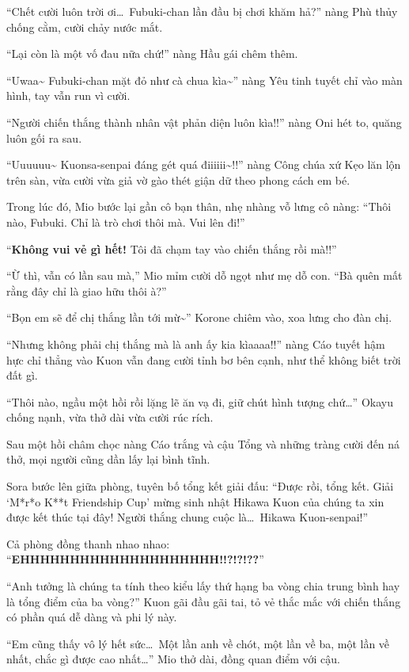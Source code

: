\documentclass[../main.tex]{subfiles}
\begin{document}
``Chết cười luôn trời ơi\dots\ Fubuki-chan lần đầu bị chơi khăm hả?'' nàng Phù thủy chống cằm, cười chảy nước mắt.

``Lại còn là một vố đau nữa chứ!'' nàng Hầu gái chêm thêm.

``Uwaa\~{} Fubuki-chan mặt đỏ như cà chua kìa\~{}'' nàng Yêu tinh tuyết chỉ vào màn hình, tay vẫn run vì cười.

``Người chiến thắng thành nhân vật phản diện luôn kìa!!'' nàng Oni hét to, quăng luôn gối ra sau.

``Uuuuuu\~{} Kuonsa-senpai đáng gét quá điiiiii\~{}!!'' nàng Công chúa xứ Kẹo lăn lộn trên sàn, vừa cười vừa giả vờ gào thét giận dữ theo phong cách em bé.

Trong lúc đó, Mio bước lại gần cô bạn thân, nhẹ nhàng vỗ lưng cô nàng: ``Thôi nào, Fubuki. Chỉ là trò chơi thôi mà. Vui lên đi!''

``\textbf{Không vui vẻ gì hết!} Tôi đã chạm tay vào chiến thắng rồi mà!!''

``Ừ thì, vẫn có lần sau mà,'' Mio mỉm cười dỗ ngọt như mẹ dỗ con. ``Bà quên mất rằng đây chỉ là giao hữu thôi à?''

``Bọn em sẽ để chị thắng lần tới mừ\~{}'' Korone chiêm vào, xoa lưng cho đàn chị.

``Nhưng không phải chị thắng mà là anh ấy kia kìaaaa!!'' nàng Cáo tuyết hậm hực chỉ thẳng vào Kuon vẫn đang cười tỉnh bơ bên cạnh, như thể không biết trời đất gì.

``Thôi nào, ngầu một hồi rồi lặng lẽ ăn vạ đi, giữ chút hình tượng chứ\dots'' Okayu chống nạnh, vừa thở dài vừa cười rúc rích.

Sau một hồi châm chọc nàng Cáo trắng và cậu Tổng và những tràng cười đến ná thở, mọi người cũng dần lấy lại bình tĩnh.

Sora bước lên giữa phòng, tuyên bố tổng kết giải đấu: ``Được rồi, tổng kết. Giải `M*r*o K**t Friendship Cup' mừng sinh nhật Hikawa Kuon của chúng ta xin được kết thúc tại đây! Người thắng chung cuộc là\dots\ Hikawa Kuon-senpai!''

Cả phòng đồng thanh nhao nhao: ``\textbf{EHHHHHHHHHHHHHHHHHHHH!!?!?!??}''

``Anh tưởng là chúng ta tính theo kiểu lấy thứ hạng ba vòng chia trung bình hay là tổng điểm của ba vòng?'' Kuon gãi đầu gãi tai, tỏ vẻ thắc mắc với chiến thắng có phần quá dễ dàng và phi lý này.

``Em cũng thấy vô lý hết sức\dots\ Một lần anh về chót, một lần về ba, một lần về nhất, chắc gì được cao nhất\dots'' Mio thở dài, đồng quan điểm với cậu.
\end{document}

